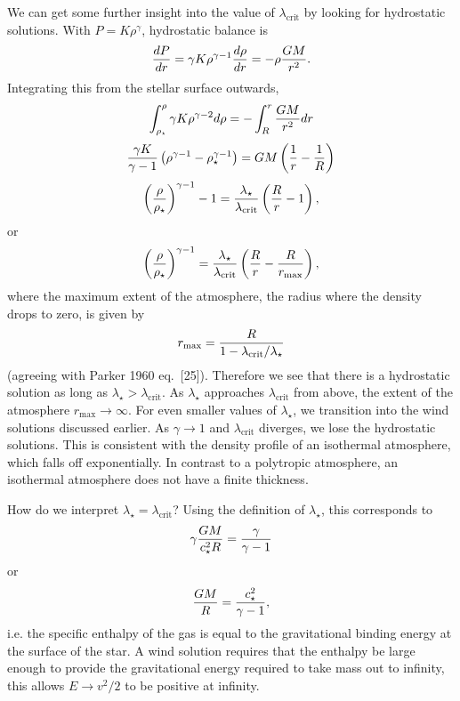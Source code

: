 \documentclass[preprint,12pt]{aastex}
\begin{document}
We can get some further insight into the value of $\lambda_\mathrm{crit}$ by looking for hydrostatic solutions. With $P=K\rho^\gamma$, hydrostatic balance is  
\begin{equation}
{dP\over dr} = \gamma K \rho^{\gamma-1} {d\rho\over dr} = -\rho {GM\over r^2}.
\end{equation}
Integrating this from the stellar surface outwards,
\begin{equation}
\int_{\rho_\star}^\rho \gamma K \rho^{\gamma-2} d\rho = - \int_R^r {GM\over r^2} dr
\end{equation}
\begin{equation}
{\gamma K\over \gamma-1}\left(\rho^{\gamma-1}-\rho_\star^{\gamma-1}\right) = GM \left({1\over r} - {1\over R}\right)
\end{equation}
\begin{equation}
\left({\rho\over \rho_\star}\right)^{\gamma-1}-1 = {\lambda_\star\over \lambda_\mathrm{crit}} \left({R\over r} -1\right),
\end{equation}
or 
\begin{equation}
\left({\rho\over\rho_\star}\right)^{\gamma-1} = {\lambda_\star\over \lambda_\mathrm{crit}}\left({R\over r}-{R\over r_\mathrm{max}}\right),
\end{equation}
where the maximum extent of the atmosphere, the radius where the density drops to zero, is given by
\begin{equation}
r_\mathrm{max} = {R\over 1-\lambda_\mathrm{crit}/\lambda_\star}
\end{equation}
(agreeing with Parker 1960 eq.~[25]).
Therefore we see that there is a hydrostatic solution as long as $\lambda_\star > \lambda_\mathrm{crit}$. As $\lambda_\star$ approaches $\lambda_\mathrm{crit}$ from above, the extent of the atmosphere $r_\mathrm{max}\rightarrow \infty$. For even smaller values of $\lambda_\star$, we transition into the wind solutions discussed earlier. As $\gamma\rightarrow 1$ and $\lambda_\mathrm{crit}$ diverges, we lose the hydrostatic solutions. This is consistent with the density profile of an isothermal atmosphere, which falls off exponentially. In contrast to a polytropic atmosphere, an isothermal atmosphere does not have a finite thickness. 

How do we interpret $\lambda_\star = \lambda_\mathrm{crit}$? Using the definition of $\lambda_\star$, this corresponds to
\begin{equation}
\gamma {GM\over c_\star^2 R} = {\gamma\over \gamma-1}
\end{equation}
or 
\begin{equation}
{GM\over R} = {c_\star^2\over \gamma-1},
\end{equation}
i.e. the specific enthalpy of the gas is equal to the gravitational binding energy at the surface of the star. A wind solution requires that the enthalpy be large enough to provide the gravitational energy required to take mass out to infinity, this allows $E\rightarrow v^2/2$ to be positive at infinity.
\end{document}
